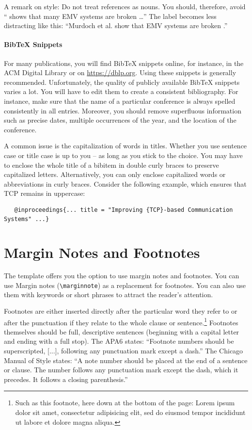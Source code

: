 A remark on style: Do not treat references as nouns. You should, therefore, avoid ``\cite{murdoch_steven_j._chip_2010} shows that many EMV systems are broken \ldots'' The label becomes less distracting like this: ``Murdoch et al. show that EMV systems are broken  \cite{murdoch_steven_j._chip_2010}.''

\paragraph{BibTeX Snippets}

For many publications, you will find BibTeX snippets online, for instance, in the ACM Digital Library or on \url{https://dblp.org}. Using these snippets is generally recommended. Unfortunately, the quality of publicly available BibTeX snippets varies a lot. You will have to edit them to create a consistent bibliography. For instance, make sure that the name of a particular conference is always spelled consistently in all entries. Moreover, you should remove superfluous information such as precise dates, multiple occurrences of the year, and the location of the conference.

A common issue is the capitalization of words in titles. Whether you use sentence case or title case is up to you -- as long as you stick to the choice. You may have to enclose the whole title of a bibitem in double curly braces to preserve capitalized letters. Alternatively, you can only enclose capitalized words or abbreviations in curly braces. Consider the following example, which ensures that TCP remains in uppercase:
\begin{verbatim}
   @inproceedings{... title = "Improving {TCP}-based Communication Systems" ...}
\end{verbatim}

\section{Margin Notes and Footnotes}

The template offers you the option to use margin notes and footnotes. You can use Margin notes (\verb|\marginnote|) as a replacement for footnotes. You can also use them with keywords or short phrases to attract the reader's attention.

Footnotes are either inserted directly after the particular word they refer to or after the punctuation if they relate to the whole clause or sentence.\footnote{Such as this footnote, here down at the bottom of the page: Lorem ipsum dolor sit amet, consectetur adipisicing elit, sed do eiusmod tempor incididunt ut labore et dolore magna aliqua.} Footnotes themselves should be full, descriptive sentences (beginning with a capital letter and ending with a full stop). The APA6 states: \enquote{Footnote numbers should be superscripted, [...], following any punctuation mark except a dash.} The Chicago Manual of Style states: \enquote{A note number should be placed at the end of a sentence or clause. The number follows any punctuation mark except the dash, which it precedes. It follows a closing parenthesis.}

